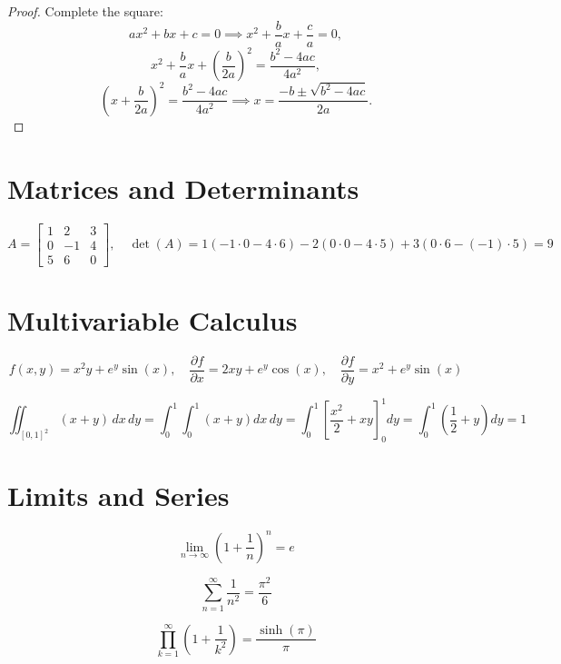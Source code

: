 \begin{proof}
Complete the square:
\[
ax^2 + bx + c = 0 \implies x^2 + \frac{b}{a}x + \frac{c}{a} = 0,
\]
\[
x^2 + \frac{b}{a}x + \left(\frac{b}{2a}\right)^2 = \frac{b^2 - 4ac}{4a^2},
\]
\[
\left(x + \frac{b}{2a}\right)^2 = \frac{b^2 - 4ac}{4a^2} \implies x = \frac{-b \pm \sqrt{b^2 - 4ac}}{2a}.
\]
\end{proof}

\section{Matrices and Determinants}

\[
A = \begin{bmatrix}
1 & 2 & 3 \\
0 & -1 & 4 \\
5 & 6 & 0
\end{bmatrix}, \quad
\det(A) = 1(-1\cdot0 - 4\cdot6) - 2(0\cdot0 - 4\cdot5) + 3(0\cdot6 - (-1)\cdot5) = 9
\]

\section{Multivariable Calculus}

\[
f(x,y) = x^2y + e^y\sin(x), \quad
\frac{\partial f}{\partial x} = 2xy + e^y \cos(x), \quad
\frac{\partial f}{\partial y} = x^2 + e^y \sin(x)
\]

\[
\iint_{[0,1]^2} (x+y) \, dx\, dy = \int_0^1 \int_0^1 (x+y) dx\, dy = \int_0^1 \left[ \frac{x^2}{2} + xy \right]_0^1 dy = \int_0^1 \left( \frac12 + y \right) dy = 1
\]

\section{Limits and Series}

\[
\lim_{n \to \infty} \left( 1 + \frac{1}{n} \right)^n = e
\]

\[
\sum_{n=1}^{\infty} \frac{1}{n^2} = \frac{\pi^2}{6}
\]

\[
\prod_{k=1}^{\infty} \left( 1 + \frac{1}{k^2} \right) = \frac{\sinh(\pi)}{\pi}
\]
